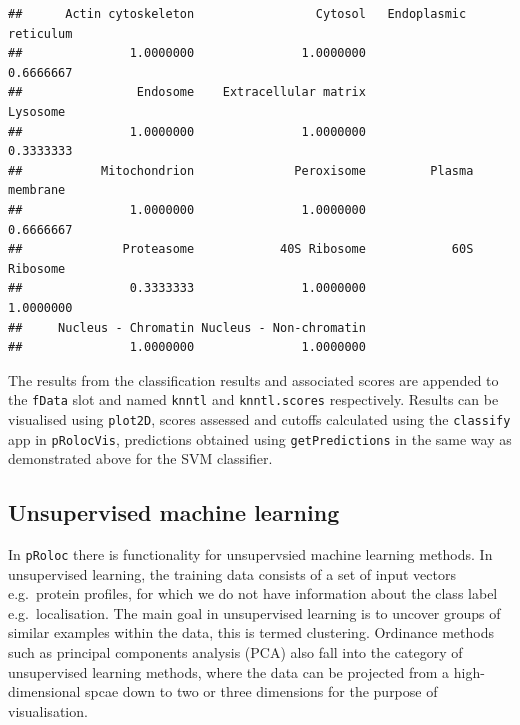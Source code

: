 \begin{verbatim}
##      Actin cytoskeleton                 Cytosol   Endoplasmic reticulum 
##               1.0000000               1.0000000               0.6666667 
##                Endosome    Extracellular matrix                Lysosome 
##               1.0000000               1.0000000               0.3333333 
##           Mitochondrion              Peroxisome         Plasma membrane 
##               1.0000000               1.0000000               0.6666667 
##              Proteasome            40S Ribosome            60S Ribosome 
##               0.3333333               1.0000000               1.0000000 
##     Nucleus - Chromatin Nucleus - Non-chromatin 
##               1.0000000               1.0000000
\end{verbatim}

\begin{Shaded}
\begin{Highlighting}[]
\StringTok{ }\NormalTok{bestpar[}\NormalTok{(hl)]}

\StringTok{ } 
                           \NormalTok{(}\NormalTok{, }\NormalTok{))}
\end{Highlighting}
\end{Shaded}

The results from the classification results and associated scores are
appended to the \texttt{fData} slot and named \texttt{knntl} and
\texttt{knntl.scores} respectively. Results can be visualised using
\texttt{plot2D}, scores assessed and cutoffs calculated using the
\texttt{classify} app in \texttt{pRolocVis}, predictions obtained using
\texttt{getPredictions} in the same way as demonstrated above for the
SVM classifier.

\subsection{Unsupervised machine
learning}\label{unsupervised-machine-learning}

In \texttt{pRoloc} there is functionality for unsupervsied machine
learning methods. In unsupervised learning, the training data consists
of a set of input vectors e.g.~protein profiles, for which we do not
have information about the class label e.g.~localisation. The main goal
in unsupervised learning is to uncover groups of similar examples within
the data, this is termed clustering. Ordinance methods such as principal
components analysis (PCA) also fall into the category of unsupervised
learning methods, where the data can be projected from a
high-dimensional spcae down to two or three dimensions for the purpose
of visualisation.


